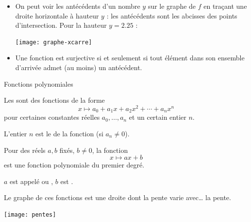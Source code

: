 \begin{frame}
  \begin{remark}
    \begin{itemize}
    \item On peut \og voir\fg{} les antécédents d'un nombre \(y\) sur le graphe de \(f\) en traçant une droite horizontale à hauteur \(y\) : les antécédents sont les abcisses des points d'intersection. Pour la hauteur \(y = 2.25\) :
      \begin{center}
        \texttt{[image: graphe-xcarre]}
      \end{center}
    \item Une fonction est surjective si et seulement si tout élément dans son ensemble d'arrivée admet (au moins) un antécédent.
    \end{itemize}
  \end{remark}

\end{frame}
\begin{frame}{Fonctions polynomiales}
  \begin{definition}
    Les  sont des fonctions de la forme
    \begin{equation*}
      x \mapsto a_0 + a_1 x + a_2 x^2 + \cdots + a_n x^n
    \end{equation*}
    pour certaines constantes réelles $a_0, \ldots, a_n$ et un certain entier $n$.\pause

    L'entier \(n\) est le  de la fonction (si $a_n \neq 0$).
  \end{definition}\pause
\end{frame}

\begin{frame}
  \begin{example}Pour des réels \(a,b\) fixés, \(b\neq0\), la fonction
    \begin{equation*}
      x \mapsto ax+b
    \end{equation*}
    est une fonction polynomiale du premier degré.

    \(a\) est appelé  ou , \(b\) est .

    Le graphe de ces fonctions est une droite dont la pente varie avec\dots{} la pente.
  \end{example}
\end{frame}

\begin{frame}
  \begin{center}
    \texttt{[image: pentes]}
  \end{center}
\end{frame}

